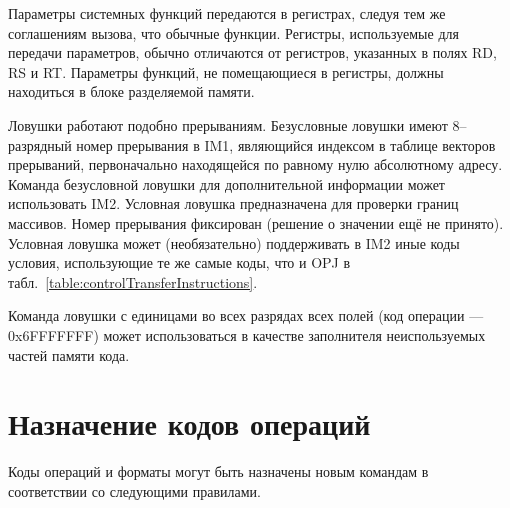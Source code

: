 \documentclass[forwardcom.tex]{subfiles}
\begin{document}
Параметры системных функций передаются в регистрах, следуя тем же соглашениям вызова, что обычные функции. Регистры, используемые для передачи параметров, обычно отличаются от регистров, указанных в полях RD, RS и RT. Параметры функций, не помещающиеся в регистры, должны находиться в блоке разделяемой памяти.

Ловушки работают подобно прерываниям. Безусловные ловушки имеют 8--разрядный номер прерывания в IM1, являющийся индексом в таблице векторов прерываний, первоначально находящейся по равному нулю абсолютному адресу. Команда безусловной ловушки для дополнительной информации может использовать IM2. Условная ловушка предназначена для проверки границ массивов. Номер прерывания фиксирован (решение о значении ещё не принято). Условная ловушка может (необязательно) поддерживать в IM2 иные коды условия, использующие те же самые коды, что и OPJ в табл.~\ref{table:controlTransferInstructions}.

Команда ловушки с единицами во всех разрядах всех полей (код операции ---  0x6FFFFFFF) может использоваться в качестве заполнителя неиспользуемых частей памяти кода.

\section{Назначение кодов операций}
Коды операций и форматы могут быть назначены новым командам в соответствии со следующими правилами.
\end{document}
